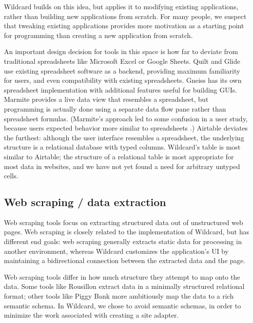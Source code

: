 \documentclass[english,submission]{programming}
\begin{document}
Wildcard builds on this idea, but applies it to modifying existing
applications, rather than building new applications from scratch. For
many people, we suspect that tweaking existing applications provides
more motivation as a starting point for programming than creating a new
application from scratch.

An important design decision for tools in this space is how far to
deviate from traditional spreadsheets like Microsoft Excel or Google
Sheets. Quilt and Glide use existing spreadsheet software as a backend,
providing maximum familiarity for users, and even compatibility with
existing spreadsheets. Gneiss has its own spreadsheet implementation
with additional features useful for building GUIs. Marmite provides a
live data view that resembles a spreadsheet, but programming is actually
done using a separate data flow pane rather than spreadsheet formulas.
(Marmite's approach led to some confusion in a user study, because users
expected behavior more similar to spreadsheets \autocite{wong2007}.)
Airtable deviates the furthest: although the user interface resembles a
spreadsheet, the underlying structure is a relational database with
typed columns. Wildcard's table is most similar to Airtable; the
structure of a relational table is most appropriate for most data in
websites, and we have not yet found a need for arbitrary untyped cells.

\hypertarget{web-scraping-data-extraction}{%
\subsection{Web scraping / data
extraction}\label{web-scraping-data-extraction}}

Web scraping tools focus on extracting structured data out of
unstructured web pages. Web scraping is closely related to the
implementation of Wildcard, but has different end goals: web scraping
generally extracts static data for processing in another environment,
whereas Wildcard customizes the application's UI by maintaining a
bidirectional connection between the extracted data and the page.

Web scraping tools differ in how much structure they attempt to map onto
the data. Some tools like Rousillon \autocite{chasins2018} extract data
in a minimally structured relational format; other tools like Piggy Bank
\autocite{huynh2005} more ambitiously map the data to a rich semantic
schema. In Wildcard, we chose to avoid semantic schemas, in order to
minimize the work associated with creating a site adapter.
\end{document}
